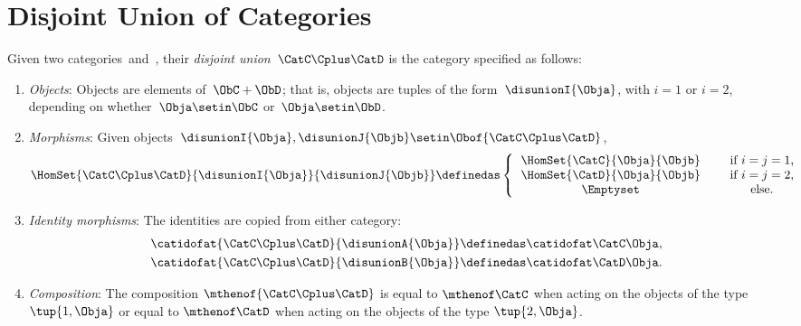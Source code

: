 
\section{Disjoint Union of Categories}

\begin{ctdefinition}
    \label{def:disjoint-union-category}
    Given two categories~\CatC and~\CatD, their \emph{disjoint union}~$\CatC\Cplus\CatD$ is the category specified as follows:
    \begin{enumerate}
        \item \emph{Objects}: Objects are elements of~$\ObC + \ObD$; that is, objects are tuples of the form~$\disunionI{\Obja}$, with $i=1$ or $i=2$, depending on whether~$\Obja \setin \ObC$ or~$\Obja \setin \ObD$.
        \item \emph{Morphisms}: Given objects~$\disunionI{\Obja}, \disunionJ{\Objb} \setin \Obof{\CatC\Cplus\CatD}$,
              \begin{equation}
                  \HomSet{\CatC\Cplus\CatD}{\disunionI{\Obja}}{\disunionJ{\Objb}} \definedas
                  \left\{
                  \begin{tabular}{ccc}
                      $\HomSet{\CatC}{\Obja}{\Objb}$ &  & if $i=j = 1$, \\
                      $\HomSet{\CatD}{\Obja}{\Objb}$ &  & if $i = j =2$, \\
                      $\Emptyset$                    &  & else.
                  \end{tabular}
                  \right.{}
              \end{equation}
        \item \emph{Identity morphisms}: The identities  are copied from either category:
              \begin{align}
                  \catidofat{\CatC\Cplus\CatD}{\disunionA{\Obja}} & \definedas \catidofat\CatC\Obja, \\
                  \catidofat{\CatC\Cplus\CatD}{\disunionB{\Obja}} & \definedas \catidofat\CatD\Obja.
              \end{align}
        \item \emph{Composition}: The composition $\mthenof{\CatC\Cplus\CatD}$ is equal to $\mthenof\CatC$ when acting on the objects of the type $\tup{1, \Obja}$ or equal to $\mthenof\CatD$
              when acting on the objects of the type $\tup{2, \Obja}$.

\end{enumerate}
\end{ctdefinition}
